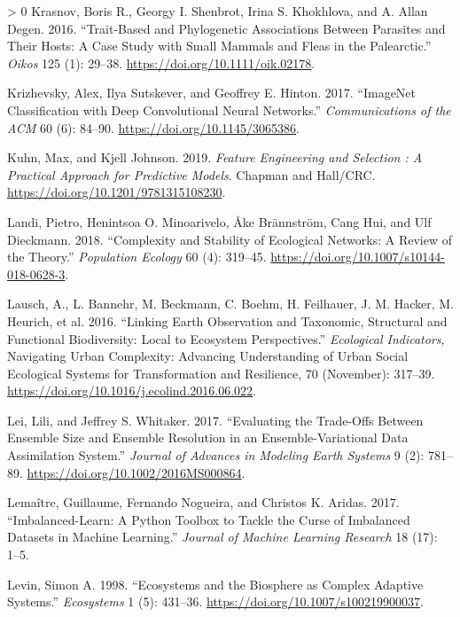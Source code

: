 \documentclass[11pt]{article}
\newlength{\cslhangindent}
\newenvironment{CSLReferences}[3] %
 {%
  \setlength{\parindent}{0pt}
  \ifodd #1 \everypar{\setlength{\hangindent}{\cslhangindent}}\ignorespaces\fi
  \ifnum #2 > 0
  \setlength{\parskip}{#2\baselineskip}
  \fi
 }%
 {}
\begin{document}
\begin{CSLReferences}{1}{0}
\leavevmode\hypertarget{ref-Krasnov2016TraPhy}{}%
Krasnov, Boris R., Georgy I. Shenbrot, Irina S. Khokhlova, and A. Allan
Degen. 2016. {``Trait-Based and Phylogenetic Associations Between
Parasites and Their Hosts: A Case Study with Small Mammals and Fleas in
the Palearctic.''} \emph{Oikos} 125 (1): 29--38.
\url{https://doi.org/10.1111/oik.02178}.

\leavevmode\hypertarget{ref-Krizhevsky2017ImaCla}{}%
Krizhevsky, Alex, Ilya Sutskever, and Geoffrey E. Hinton. 2017.
{``ImageNet Classification with Deep Convolutional Neural Networks.''}
\emph{Communications of the ACM} 60 (6): 84--90.
\url{https://doi.org/10.1145/3065386}.

\leavevmode\hypertarget{ref-Kuhn2019FeaEng}{}%
Kuhn, Max, and Kjell Johnson. 2019. \emph{Feature Engineering and
Selection : A Practical Approach for Predictive Models}. Chapman and
Hall/CRC. \url{https://doi.org/10.1201/9781315108230}.

\leavevmode\hypertarget{ref-Landi2018ComSta}{}%
Landi, Pietro, Henintsoa O. Minoarivelo, Åke Brännström, Cang Hui, and
Ulf Dieckmann. 2018. {``Complexity and Stability of Ecological Networks:
A Review of the Theory.''} \emph{Population Ecology} 60 (4): 319--45.
\url{https://doi.org/10.1007/s10144-018-0628-3}.

\leavevmode\hypertarget{ref-Lausch2016LinEar}{}%
Lausch, A., L. Bannehr, M. Beckmann, C. Boehm, H. Feilhauer, J. M.
Hacker, M. Heurich, et al. 2016. {``Linking Earth Observation and
Taxonomic, Structural and Functional Biodiversity: Local to Ecosystem
Perspectives.''} \emph{Ecological Indicators}, Navigating Urban
Complexity: Advancing Understanding of Urban Social Ecological Systems
for Transformation and Resilience, 70 (November): 317--39.
\url{https://doi.org/10.1016/j.ecolind.2016.06.022}.

\leavevmode\hypertarget{ref-Lei2017EvaTra}{}%
Lei, Lili, and Jeffrey S. Whitaker. 2017. {``Evaluating the Trade-Offs
Between Ensemble Size and Ensemble Resolution in an Ensemble-Variational
Data Assimilation System.''} \emph{Journal of Advances in Modeling Earth
Systems} 9 (2): 781--89. \url{https://doi.org/10.1002/2016MS000864}.

\leavevmode\hypertarget{ref-Lemaitre2017ImbPyt}{}%
Lemaître, Guillaume, Fernando Nogueira, and Christos K. Aridas. 2017.
{``Imbalanced-Learn: A Python Toolbox to Tackle the Curse of Imbalanced
Datasets in Machine Learning.''} \emph{Journal of Machine Learning
Research} 18 (17): 1--5.

\leavevmode\hypertarget{ref-Levin1998EcoBio}{}%
Levin, Simon A. 1998. {``Ecosystems and the Biosphere as Complex
Adaptive Systems.''} \emph{Ecosystems} 1 (5): 431--36.
\url{https://doi.org/10.1007/s100219900037}.


\end{CSLReferences}
\end{document}
